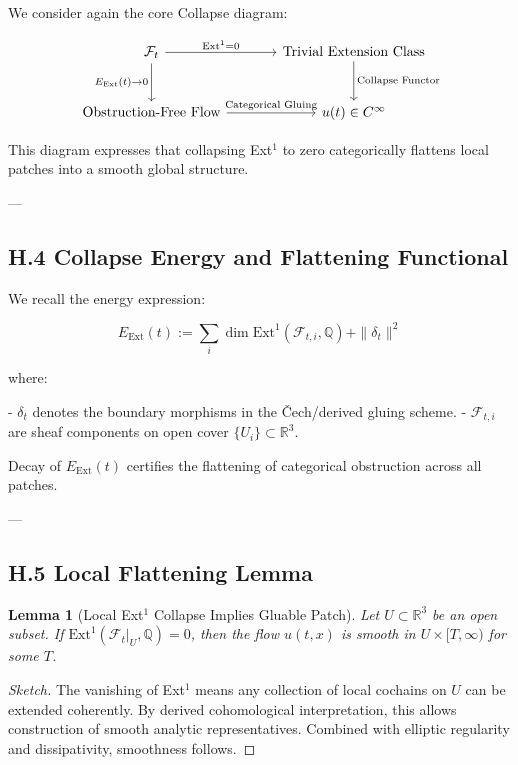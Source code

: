 \documentclass[11pt]{article}
\newtheorem{lemma}[theorem]{Lemma}
\begin{document}
We consider again the core Collapse diagram:

\[
\begin{tikzcd}[row sep=large, column sep=large]
\mathcal{F}_t
  \arrow[r, "{\mathrm{Ext}^1 = 0}"]
  \arrow[d, "{E_{\mathrm{Ext}}(t) \to 0}"']
& \text{Trivial Extension Class}
  \arrow[d, "{\text{Collapse Functor}}"] \\
\text{Obstruction-Free Flow}
  \arrow[r, "{\text{Categorical Gluing}}"]
& u(t) \in C^\infty
\end{tikzcd}
\]

This diagram expresses that collapsing Ext\(^1\) to zero categorically flattens local patches into a smooth global structure.

---

\subsection*{H.4 Collapse Energy and Flattening Functional}

We recall the energy expression:

\[
E_{\mathrm{Ext}}(t) := \sum_i \dim \mathrm{Ext}^1(\mathcal{F}_{t,i}, \mathbb{Q}) + \| \delta_t \|^2
\]

where:

- \( \delta_t \) denotes the boundary morphisms in the Čech/derived gluing scheme.
- \( \mathcal{F}_{t,i} \) are sheaf components on open cover \( \{ U_i \} \subset \mathbb{R}^3 \).

Decay of \( E_{\mathrm{Ext}}(t) \) certifies the flattening of categorical obstruction across all patches.

---

\subsection*{H.5 Local Flattening Lemma}

\begin{lemma}[Local Ext$^1$ Collapse Implies Gluable Patch]
Let \( U \subset \mathbb{R}^3 \) be an open subset.  
If \( \mathrm{Ext}^1(\mathcal{F}_t|_U, \mathbb{Q}) = 0 \),  
then the flow \( u(t,x) \) is smooth in \( U \times [T, \infty) \) for some \( T \).
\end{lemma}

\begin{proof}[Sketch]
The vanishing of Ext\(^1\) means any collection of local cochains on \( U \) can be extended coherently.  
By derived cohomological interpretation, this allows construction of smooth analytic representatives.  
Combined with elliptic regularity and dissipativity, smoothness follows.
\end{proof}
\end{document}
